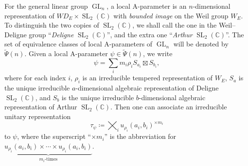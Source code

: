 \documentclass[11pt,letterpaper]{amsart}
\theoremstyle{plain}
\numberwithin{theorem}{section}
\numberwithin{equation}{subsection}
\theoremstyle{remark}
\newcommand{\GL}{\operatorname{GL}}
\newcommand{\SL}{\operatorname{SL}}
\newcommand{\C}{\mathbb{C}}
\begin{document}
\vskip 5pt

For the general linear group $\GL_n$, a local A-parameter is an $n$-dimensional representation of $WD_E\times \SL_2(\C)$ with \emph{bounded image} on the Weil group $W_E$. To distinguish the two copies of $\SL_2(\C)$, we shall call the one in the Weil--Deligne group ``\emph{Deligne} $\SL_2(\C)$'', and the extra one ``\emph{Arthur} $\SL_2(\C)$''. The set of equivalence classes of local A-parameters of $\GL_n$ will be denoted by $\widetilde{\Psi}(n)$. Given a local A-parameter $\psi\in\widetilde{\Psi}(n)$, we write
\[
    \psi = \sum_i m_i \rho_i S_{a_i}\boxtimes S_{b_i},
\]
where for each index $i$, $\rho_i$ is an irreducible tempered representation of $W_E$, $S_a$ is the unique irreducible $a$-dimensional algebraic representation of Deligne $\SL_2(\C)$, and $S_b$ is the unique irreducible $b$-dimensional algebraic representation of Arthur $\SL_2(\C)$. Then one can associate an irreducible unitary representation
\[
    \tau_\psi \coloneqq \bigtimes_i u_{\rho_i}\left(a_i,b_i\right)^{\times m_i} 
\]
to $\psi$, where the superscript ``$\times m_i$'' is the abbreviation for $\underbrace{u_{\rho_i}\left(a_i,b_i\right)\times\cdots\times u_{\rho_i}\left(a_i,b_i\right)}_{m_i\text{-times}}$.

\vskip 5pt
\end{document}

